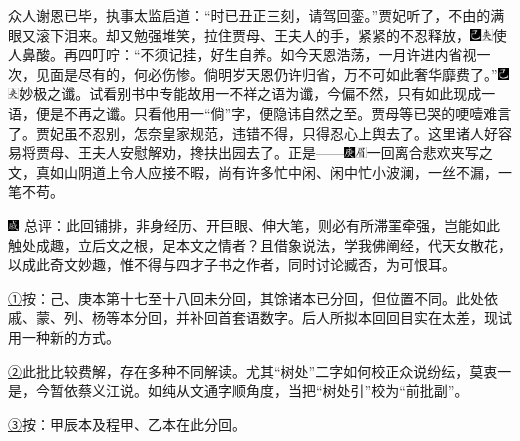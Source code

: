 众人谢恩已毕，执事太监启道：``时已丑正三刻，请驾回銮。''贾妃听了，不由的满眼又滚下泪来。却又勉强堆笑，拉住贾母、王夫人的手，紧紧的不忍释放，{\includegraphics[width=3mm]{../Images/00003}\includegraphics[width=3mm]{../Images/00012}\footnotesize \kaishu 使人鼻酸。}再四叮咛：``不须记挂，好生自养。如今天恩浩荡，一月许进内省视一次，见面是尽有的，何必伤惨。倘明岁天恩仍许归省，万不可如此奢华靡费了。''{\includegraphics[width=3mm]{../Images/00003}\includegraphics[width=3mm]{../Images/00012}\footnotesize \kaishu 妙极之谶。试看别书中专能故用一不祥之语为谶，今偏不然，只有如此现成一语，便是不再之谶。只看他用一``倘''字，便隐讳自然之至。}贾母等已哭的哽噎难言了。贾妃虽不忍别，怎奈皇家规范，违错不得，只得忍心上舆去了。这里诸人好容易将贾母、王夫人安慰解劝，搀扶出园去了。正是------{\includegraphics[width=3mm]{../Images/00004}\includegraphics[width=3mm]{../Images/00010}\footnotesize \kaishu 一回离合悲欢夹写之文，真如山阴道上令人应接不暇，尚有许多忙中闲、闲中忙小波澜，一丝不漏，一笔不苟。}

{\includegraphics[width=3mm]{../Images/00005}  \kaishu 总评：此回铺排，非身经历、开巨眼、伸大笔，则必有所滞}罣{牵强，岂能如此触处成趣，立后文之根，足本文之情者？且借象说法，学我佛阐经，代天女散花，以成此奇文妙趣，惟不得与四才子书之作者，同时讨论臧否，为可恨耳。}



{\href{../Text/part0022_split_000.html\#navto_1_a}{①}按：己、庚本第十七至十八回未分回，其馀诸本已分回，但位置不同。此处依戚、蒙、列、杨等本分回，并补回首套语数字。后人所拟本回回目实在太差，现试用一种新的方式。}

{\href{../Text/part0022_split_000.html\#navto_2_a}{②}此批比较费解，存在多种不同解读。尤其``树处''二字如何校正众说纷纭，莫衷一是，今暂依蔡义江说。如纯从文通字顺角度，当把``树处引''校为``前批副''。}

{\href{../Text/part0022_split_000.html\#navto_3_a}{③}按：甲辰本及程甲、乙本在此分回。}
